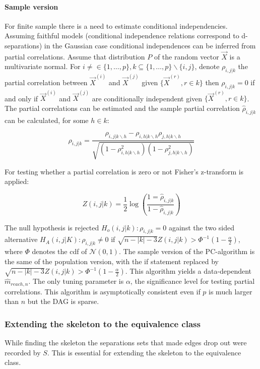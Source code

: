 			\paragraph{Sample version}
			For finite sample there is a need to estimate conditional independencies.
			Assuming faithful models (conditional independence relations correspond to d-separations) in the Gaussian case conditional independences can be inferred from partial correlations.
			Assume that distribution $P$ of the random vector $\vec{X}$ is a multivariate normal.
			For $i\neq\in\{1,\dots,p\}, k\subseteq\{1,\dots, p\}\backslash\{i,j\}$, denote $\rho_{i,j|k}$ the partial correlation between $\vec{X}^{(i)}$ and $\vec{X}^{(j)}$ given $\{\vec{X}^{(r)}, r\in k\}$ then $\rho_{i,j|k} = 0$ if and only if $\vec{X}^{(i)}$ and $\vec{X}^{(j)}$ are conditionally independent given $\{\vec{X}^{(r)}, r\in k\}$.
			The partial correlations can be estimated and the sample partial correlation $\hat{\rho}_{i,j|k}$ can be calculated, for some $h\in k$:

			$$\rho_{i,j|k} = \frac{\rho_{i,j|k\backslash h}-\rho_{i,h|k\backslash h}\rho_{j,h|k\backslash h}}{\sqrt{(1-\rho^2_{i,h|k\backslash h})(1-\rho^2_{j,h|k\backslash h})}}$$

			For testing whether a partial correlation is zero or not Fisher's z-transform is applied:

			$$Z(i,j|k) = \frac{1}{2} \log(\frac{1=\hat{\rho}_{i,j|k}}{1-\hat{\rho}_{i,j|k}})$$

			The null hypothesis is rejected $H_o(i,j|k):\rho_{i,j|k} = 0$ against the two sided alternative $H_A(i,j|K): \rho_{i,j|k} \neq 0$ if $\sqrt{n-|k|-3}Z(i,j|k)>\Phi^{-1}(1-\frac{\alpha}{2})$, where $\Phi$ denotes the cdf of $\mathcal{N}(0,1)$.
			The sample version of the PC-algorithm is the same of the population version, with the if statement replaced by $\sqrt{n-|k|-3}Z(i,j|k)>\Phi^{-1}(1-\frac{\alpha}{2})$.
			This algorithm yields a data-dependent $\hat{m}_{reach,n}$.
			The only tuning parameter is $\alpha$, the significance level for testing partial correlations.
			This algorithm is asymptotically consistent even if $p$ is much larger than $n$ but the DAG is sparse.

		\subsubsection{Extending the skeleton to the equivalence class}
		While finding the skeleton the separations sets that made edges drop out were recorded by $S$.
		This is essential for extending the skeleton to the equivalence class.

